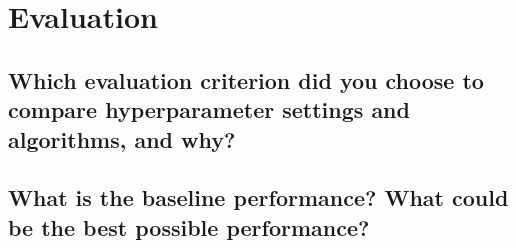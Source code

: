 
\section{Evaluation}
\label{sec:Evaluation}






\subsection{Which evaluation criterion did you choose to compare hyperparameter settings and algorithms, and why? }
\label{sec:Evaluation:a}





\subsection{What is the baseline performance? What could be the best possible performance? }
\label{sec:Evaluation:b}



